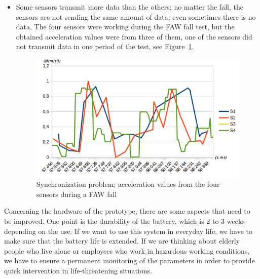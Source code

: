 \documentclass[review]{elsarticle}
\begin{document}
\begin{itemize}
 \item Some sensors transmit more data than the others; no matter the fall, the sensors are not sending the same amount of data, even sometimes there is no data. The four sensors were working during the FAW fall test, but the obtained acceleration values were from three of them, one of the sensors did not transmit data in one period of the test, see Figure~\ref{fig:synchronisation2}. 
 \begin{figure}[!ht]
  \centering
  \includegraphics[scale=0.26]{Images/synchronisation2.png}
  \caption[Comparison acceleration during two FAW falls]{Synchronization problem; acceleration values from the four sensors during a FAW fall}
  \label{fig:synchronisation2}
 \end{figure}
\end{itemize}

Concerning the hardware of the prototype, there are some aspects that need to be improved. One point is the durability of the battery, which is 2 to 3 weeks depending on the use. If we want to use this system in everyday life, we have to make sure that the battery life is extended. If we are thinking about elderly people who live alone or employees who work in hazardous working conditions, we have to ensure a permanent monitoring of the parameters in order to provide quick intervention in life-threatening situations.
\end{document}
